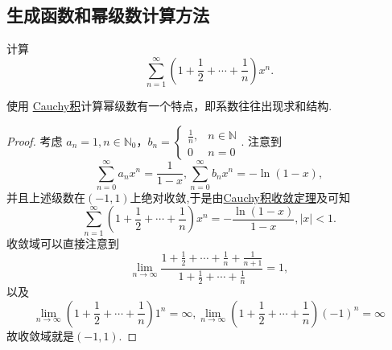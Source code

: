 \documentclass[../../main.tex]{subfiles}
\begin{document}
\subsection{生成函数和幂级数计算方法}

\begin{example}\label{example:例题11.24556415}
计算
\[
\sum_{n=1}^{\infty} \left(1 + \frac{1}{2} + \cdots + \frac{1}{n}\right) x^n.
\]
\end{example}
\begin{note}
使用 \hyperref[definition:Cauchy积]{Cauchy积}计算幂级数有一个特点，即系数往往出现求和结构.
\end{note}
\begin{proof}
考虑 \(a_n = 1, n \in \mathbb{N}_0\)，\(b_n = \begin{cases} \frac{1}{n}, & n \in \mathbb{N} \\ 0 & n = 0 \end{cases}\). 注意到
\[
\sum_{n=0}^{\infty} a_n x^n = \frac{1}{1 - x}, \sum_{n=0}^{\infty} b_n x^n = -\ln (1 - x),
\]
并且上述级数在$(-1,1)$上绝对收敛,于是由\hyperref[theorem:Cauchy积收敛定理]{Cauchy积收敛定理}及可知
\[
\sum_{n=1}^{\infty} \left(1 + \frac{1}{2} + \cdots + \frac{1}{n}\right) x^n = -\frac{\ln (1 - x)}{1 - x}, |x| < 1.
\]
收敛域可以直接注意到
\[
\lim_{n \to \infty} \frac{1 + \frac{1}{2} + \cdots + \frac{1}{n} + \frac{1}{n + 1}}{1 + \frac{1}{2} + \cdots + \frac{1}{n}} = 1,
\]
以及
\[
\lim_{n \to \infty} \left(1 + \frac{1}{2} + \cdots + \frac{1}{n}\right) 1^n = \infty, \lim_{n \to \infty} \left(1 + \frac{1}{2} + \cdots + \frac{1}{n}\right) (-1)^n = \infty
\]
故收敛域就是$(-1,1)$.

\end{proof}
\end{document}
